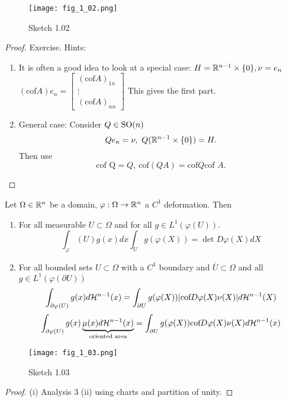 \begin{figure}[H]\label{fig:1.02}
    \centering
    \texttt{[image: fig\_1\_02.png]}
    \caption{Sketch 1.02}
\end{figure}

\begin{proof}
Exercise. Hints:
\begin{enumerate}
    \item It is often a good idea to look at a special case: \(H=\mathbb{R}^{n-1}\times \{0\},\nu=e_n\)
        \((\text{cof} A) e_n=\begin{bmatrix}
            (\text{cof} A)_{1n}\\ \vdots\\ (\text{cof} A)_{nn}
        \end{bmatrix}\) This gives the first part.
    \item General case: Consider \(Q\in {\text{SO}}(n)\) \[Qe_n=\nu, \ Q(\mathbb{R}^{n-1}\times \{0\})=H.\] Then use \[\text{cof Q}=Q,\ \text{cof}(QA)=\text{cof} Q\text{cof }A.\] 
\end{enumerate}    
\end{proof}

\begin{theorem}\label{thm:1.11}
    Let \(\Omega\in\mathbb{R}^n\) be a domain, \(\varphi:\Omega\to\mathbb{R}^n\) a \(C^1\) deformation. Then 
    \begin{enumerate}
        \item For all measurable \(U\subset\Omega\) and for all \(g\in L^1(\varphi(U))\). 
        \[\int_{\varphi}(U)g(x)dx\int_U g(\varphi(X))=\det D\varphi(X)dX\]
        \item For all bounded sets \(U\subset \Omega\) with a \(C^1\) boundary and \(\bar{U}\subset \Omega\) and all \(g\in L^1(\varphi(\partial U))\)
            \[\int_{\partial \varphi(U)}g(x)d\mathcal{H}^{n-1}(x)=\int_{\partial U} g(\varphi(X))|{\text{cof}} D\varphi(X)\nu(X)|d\mathcal{H}^{n-1}(X)\]
            \[\int_{\partial \varphi(U)}g(x)\underbrace{\mu(x)d\mathcal{H}^{n-1}(x)}_{\text{oriented area}}=\int_{\partial U}g(\varphi(X)){\text{cof}} D\varphi(X)\nu(X)d\mathcal{H}^{n-1}(x)\]
    \end{enumerate}
\end{theorem}

\begin{figure}[H]\label{fig:1.03}
    \centering
    \texttt{[image: fig\_1\_03.png]}
    \caption{Sketch 1.03}
\end{figure}

\begin{proof}
    (i) Analysis 3 (ii) using charts and partition of unity.
\end{proof}

